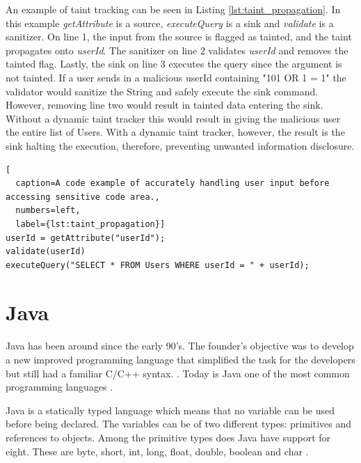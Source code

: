 An example of taint tracking can be seen in Listing \ref{lst:taint_propagation}. In this example \textit{getAttribute} is a source, \textit{executeQuery} is a sink and \textit{validate} is a sanitizer. On line 1, the input from the source is flagged as tainted, and the taint propagates onto \textit{userId}. The sanitizer on line 2 validates \textit{userId} and removes the tainted flag. Lastly, the sink on line 3 executes the query since the argument is not tainted. If a user sends in a malicious userId containing "101 OR 1 = 1" the validator would sanitize the String and safely execute the sink command. However, removing line two would result in tainted data entering the sink. Without a dynamic taint tracker this would result in giving the malicious user the entire list of Users. With a dynamic taint tracker, however, the result is the sink halting the execution, therefore, preventing unwanted information disclosure.

\hfill
\begin{minipage}[H]{\linewidth}
\begin{lstlisting}[
  caption=A code example of accurately handling user input before accessing sensitive code area.,
  numbers=left,
  label={lst:taint_propagation}]
userId = getAttribute("userId");
validate(userId)
executeQuery("SELECT * FROM Users WHERE userId = " + userId);
\end{lstlisting}
\end{minipage}
\hfill



\section{Java}
\label{JavaInstrumentation}
Java has been around since the early 90's. The founder's objective was to develop a new improved programming language that simplified the task for the developers but still had a familiar C/C++ syntax. \parencite{OracleVoice}. Today is Java one of the most common programming languages \parencite{octoverse}.

Java is a statically typed language which means that no variable can be used before being declared. The variables can be of two different types: primitives and references to objects. Among the primitive types does Java have support for eight. These are byte, short, int, long, float, double, boolean and char \parencite{primjav}.



